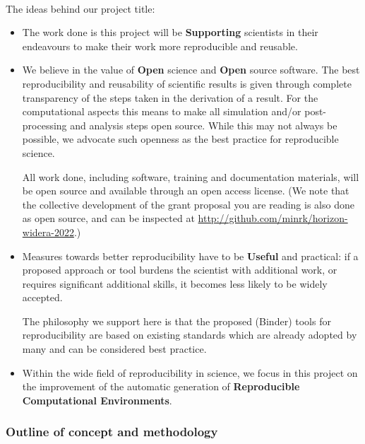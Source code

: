   \mbox{}\\

  The ideas behind our project title:
\begin{itemize}
\item The work done is this project will be \textbf{Supporting} scientists in their
  endeavours to make their work more reproducible and reusable.
\item We believe in the value of \textbf{Open} science and \textbf{Open} source software.
  The best reproducibility and reusability of scientific results is given through
  complete transparency of the steps taken in the derivation of a result. For
  the computational aspects this means to make all simulation and/or
  post-processing and analysis steps open source. While this may not always be
  possible, we advocate such openness as the best practice for reproducible science.

  All work done, including software, training and documentation materials, will
  be open source and available through an open access license. (We note that the
  collective development of the grant proposal you are reading is also done as
  open source, and can be inspected at \url{http://github.com/minrk/horizon-widera-2022}.)

\item Measures towards better reproducibility have to be \textbf{Useful} and
  practical: if a proposed approach or tool burdens the scientist with
  additional work, or requires significant additional skills, it becomes less
  likely to be widely accepted.

  The philosophy we support here is that the proposed (Binder) tools for
  reproducibility are based on existing standards which are already
  adopted by many and can be considered best practice.

\item Within the wide field of reproducibility in science, we focus in this
  project on the improvement of the automatic generation of \textbf{Reproducible
    Computational Environments}.
\end{itemize}

\subsubsection{Outline of concept and methodology}

